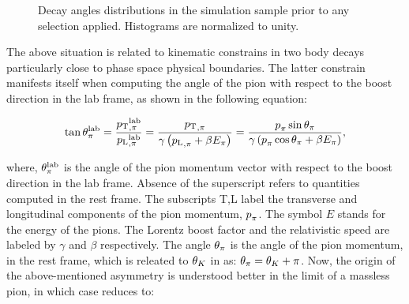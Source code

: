 \begin{figure}[t]
  \centering
  \begin{subfigure}{0.33\textwidth}
    \raggedright
    \scalebox{0.7}{}
    \caption{}
    \label{angDistr_ctk}
  \end{subfigure}%
  \hfill%
  \begin{subfigure}{0.33\textwidth}
    \raggedleft
    \scalebox{0.7}{}
    \caption{}
    \label{angDistr_ctl}
  \end{subfigure}%
  \hfill%
  \begin{subfigure}{0.33\textwidth}
    \raggedright
    \scalebox{0.7}{}
    \caption{}
    \label{angDistr_phi}
  \end{subfigure}
  \caption{Decay angles distributions in the simulation sample prior to any selection applied. Histograms are normalized to unity.}
  \label{angDistr_all}
\end{figure}

The above situation is related to kinematic constrains in two body decays particularly close to phase
space physical boundaries. The latter constrain manifests itself when computing the angle of the pion
with respect to the boost direction in the lab frame, as shown in the following equation:

\begin{equation}
  \centering
  \tan\thetapi^\lab = \frac{\ptrans{\pi}^\lab}{\plongd{\pi}^\lab}
               = \frac{\ptrans{\pi}}{\gamma\parenthesis{\plongd{\pi} + \beta E_\pi} }
               = \frac{\ptot_{\pi} \sin\thetapi}{\gamma\parenthesis{\ptot_{\pi} \cos\thetapi + \beta E_\pi} },
  \label{pi_angle}
\end{equation}

\noindent where, $\theta_{\pi}^{\rm lab}$ is the angle of the pion momentum vector with respect to the boost direction
in the lab frame. Absence of the \lab superscript refers to quantities computed in the \Kstarz rest frame.
The subscripts T,L label the transverse and longitudinal components of the pion momentum, $\mbox{$p$}_{\pi}$.
The symbol $E$ stands for the energy of the pions. The Lorentz boost factor and the relativistic speed
are labeled by $\gamma$ and $\beta$ respectively. The angle $\theta_{\pi}$ is the angle of the pion momentum,
in the \Kstarz rest frame, which is releated to $\theta_{K}$ in  as: $\theta_{\pi} = \theta_{K} + \pi$.
Now, the origin of the above-mentioned asymmetry is understood better in the limit of a massless pion,
in which case  reduces to:


